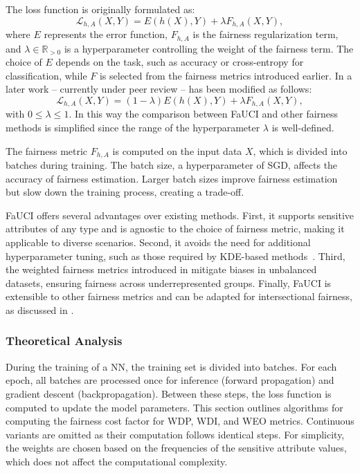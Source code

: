 %
The loss function is originally formulated as:
%
\begin{equation}
    \label{eq:fauci_loss}
    \mathcal{L}_{h,A}(X, Y) = E(h(X), Y) + \lambda F_{h,A}(X, Y),
\end{equation}
%
where \(E\) represents the error function, \(F_{h,A}\) is the fairness regularization term, and \(\lambda \in \mathbb{R}_{>0}\) is a hyperparameter controlling the weight of the fairness term.
%
The choice of \(E\) depends on the task, such as accuracy or cross-entropy for classification, while \(F\) is selected from the fairness metrics introduced earlier.
%
In a later work -- currently under peer review --  has been modified as follows:
%
\begin{equation}
    \label{eq:fauci_loss_new}
    \mathcal{L}_{h,A}(X, Y) = (1 - \lambda) E(h(X), Y) + \lambda F_{h,A}(X, Y),
\end{equation}
%
with $0 \le \lambda \le 1$.
%
In this way the comparison between \gls{FaUCI} and other fairness methods is simplified since the range of the hyperparameter \(\lambda\) is well-defined.

%
The fairness metric \(F_{h,A}\) is computed on the input data \(X\), which is divided into batches during training.
%
The batch size, a hyperparameter of \gls{SGD}, affects the accuracy of fairness estimation.
%
Larger batch sizes improve fairness estimation but slow down the training process, creating a trade-off.

%
\gls{FaUCI} offers several advantages over existing methods.
%
First, it supports sensitive attributes of any type and is agnostic to the choice of fairness metric, making it applicable to diverse scenarios.
%
Second, it avoids the need for additional hyperparameter tuning, such as those required by \gls{KDE}-based methods~\cite{placeholder}.
%
Third, the weighted fairness metrics introduced in  mitigate biases in unbalanced datasets, ensuring fairness across underrepresented groups.
%
Finally, \gls{FaUCI} is extensible to other fairness metrics and can be adapted for intersectional fairness, as discussed in .



\subsubsection{Theoretical Analysis}
\label{subsubsec:theoretical}
%
During the training of a \gls{NN}, the training set is divided into batches.
%
For each epoch, all batches are processed once for inference (forward propagation) and gradient descent (backpropagation).
%
Between these steps, the loss function is computed to update the model parameters.
%
This section outlines algorithms for computing the fairness cost factor for \gls{WDP}, \gls{WDI}, and \gls{WEO} metrics.
%
Continuous variants are omitted as their computation follows identical steps.
%
For simplicity, the weights are chosen based on the frequencies of the sensitive attribute values, which does not affect the computational complexity.

